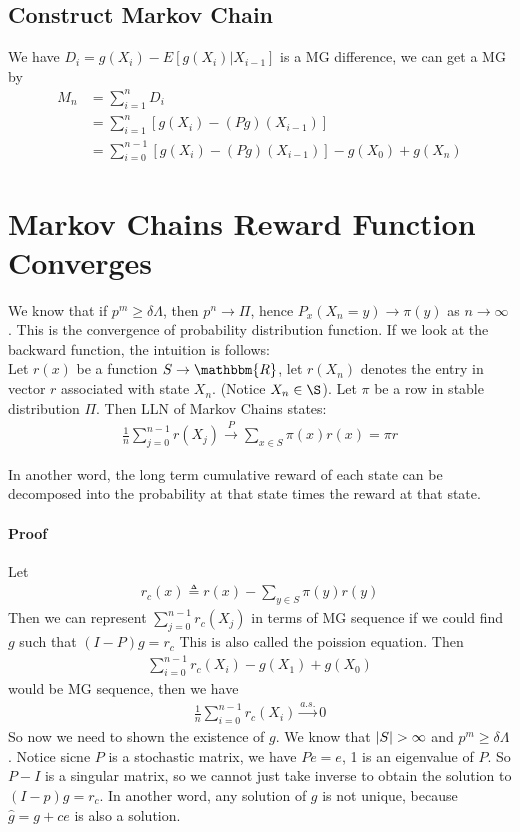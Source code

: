 \subsection{Construct Markov Chain}
We have $D_i = g(X_i) - E[g(X_i)|X_{i-1}]$ is a MG difference, we can get a MG by 
    \begin{align*}
        M_n 
        & = \sum_{i=1}^n D_i\\
        & = \sum_{i=1}^n \left[g(X_i) - (Pg)(X_{i-1}) \right]\\
        & = \sum_{i=0}^{n-1}\left[g(X_i) - (Pg)(X_{i-1}) \right] - g(X_0) + g(X_n)
    \end{align*}

\section{Markov Chains Reward Function Converges}
We know that if $p^m \geq \delta \Lambda$, then $p^n \to \Pi$, hence $P_x(X_n = y) \to \pi(y)$ as $n \to \infty$. This is the convergence of probability distribution function. If we look at the backward function, the intuition is follows: \\

Let $r(x)$ be a function $S\to \mathbbm{R}$, let $r(X_n)$ denotes the entry in vector $r$ associated with state $X_n$. (Notice $X_n \in \S$). Let $\pi$ be a row in stable distribution $\Pi$.  Then LLN of Markov Chains states: 
    \begin{align*}
        \frac{1}{n} \sum_{j=0}^{n-1} r(X_j) \overset{P}{\to} \sum_{x\in S} \pi(x) r(x) = \pi r
    \end{align*}

In another word, the long term cumulative reward of each state can be decomposed into the probability at that state times the reward at that state. 

\paragraph{Proof}
Let 
    \begin{align*}
        r_c(x) \triangleq r(x) - \sum_{y\in S} \pi(y) r(y)
    \end{align*}
Then we can represent $\sum_{j=0}^{n-1} r_c(X_j)$ in terms of MG sequence if we could find $g$ such that $(I-P)g = r_c$ This is also called the poission equation. Then 
    \begin{align*}
        \sum_{i=0}^{n-1} r_c(X_i) - g(X_1) + g(X_0)
    \end{align*}
would be MG sequence, then we have 
    \begin{align*}
        \frac{1}{n} \sum_{i=0}^{n-1} r_c(X_i) \overset{a.s.}{\to} 0
    \end{align*}
So now we need to shown the existence of $g$. We know that $\abs{S}>\infty$ and  $p^m \geq \delta \Lambda$. Notice sicne $P$ is a stochastic matrix, we have $Pe = e$, 1 is an eigenvalue of $P$. So $P-I$ is a singular matrix, so we cannot just take inverse to obtain the solution to $(I-p)g = r_c$. In another word, any solution of $g$ is not unique, because $\hat{g} = g + ce$ is also a solution. \\

